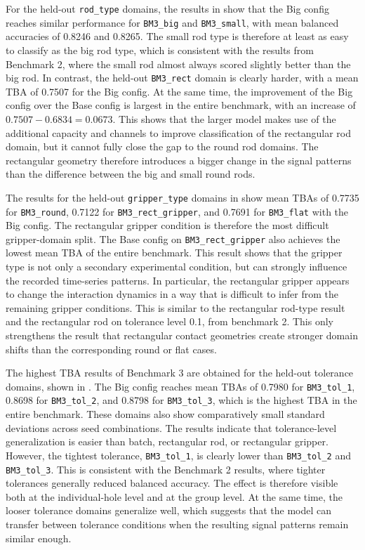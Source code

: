 For the held-out \texttt{rod\_type} domains, the results in  show that the Big config reaches similar performance for \texttt{BM3\_big} and \texttt{BM3\_small}, with mean balanced accuracies of 0.8246 and 0.8265. The small rod type is therefore at least as easy to classify as the big rod type, which is consistent with the results from Benchmark 2, where the small rod almost always scored slightly better than the big rod. In contrast, the held-out \texttt{BM3\_rect} domain is clearly harder, with a mean TBA of 0.7507 for the Big config. At the same time, the improvement of the Big config over the Base config is largest in the entire benchmark, with an increase of $0.7507 - 0.6834 = 0.0673$. This shows that the larger model makes use of the additional capacity and channels to improve classification of the rectangular rod domain, but it cannot fully close the gap to the round rod domains. The rectangular geometry therefore introduces a bigger change in the signal patterns than the difference between the big and small round rods.

The results for the held-out \texttt{gripper\_type} domains in  show mean TBAs of 0.7735 for \texttt{BM3\_round}, 0.7122 for \texttt{BM3\_rect\_gripper}, and 0.7691 for \texttt{BM3\_flat} with the Big config. The rectangular gripper condition is therefore the most difficult gripper-domain split. The Base config on \texttt{BM3\_rect\_gripper} also achieves the lowest mean TBA of the entire benchmark. This result shows that the gripper type is not only a secondary experimental condition, but can strongly influence the recorded time-series patterns. In particular, the rectangular gripper appears to change the interaction dynamics in a way that is difficult to infer from the remaining gripper conditions. This is similar to the rectangular rod-type result and the rectangular rod on tolerance level 0.1, from benchmark 2. This only strengthens the result that rectangular contact geometries create stronger domain shifts than the corresponding round or flat cases.

The highest TBA results of Benchmark 3 are obtained for the held-out tolerance domains, shown in . The Big config reaches mean TBAs of 0.7980 for \texttt{BM3\_tol\_1}, 0.8698 for \texttt{BM3\_tol\_2}, and 0.8798 for \texttt{BM3\_tol\_3}, which is the highest TBA in the entire benchmark. These domains also show comparatively small standard deviations across seed combinations. The results indicate that tolerance-level generalization is easier than batch, rectangular rod, or rectangular gripper. However, the tightest tolerance, \texttt{BM3\_tol\_1}, is clearly lower than \texttt{BM3\_tol\_2} and \texttt{BM3\_tol\_3}. This is consistent with the Benchmark 2 results, where tighter tolerances generally reduced balanced accuracy. The effect is therefore visible both at the individual-hole level and at the group level. At the same time, the looser tolerance domains generalize well, which suggests that the model can transfer between tolerance conditions when the resulting signal patterns remain similar enough.

